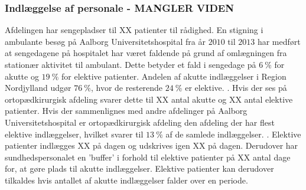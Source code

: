 \subsubsection{Indlæggelse af personale - MANGLER VIDEN}
Afdelingen har sengepladser til XX patienter til rådighed. En stigning i ambulante besøg på Aalborg Universitetshospital fra år $2010$ til $2013$ har medført at sengedagene på hospitalet har været faldende på grund af omlægningen fra stationær aktivitet til ambulant. Dette betyder et fald i sengedage på $6~\%$ for akutte og $19~\%$ for elektive patienter. Andelen af akutte indlæggelser i Region Nordjylland udgør $76~\%$, hvor de resterende $24~\%$ er elektive. \cite{RegionNord2016}. Hvis der ses på ortopædkirurgisk afdeling svarer dette til XX antal akutte og XX antal elektive patienter. Hvis der sammenlignes med andre afdelinger på Aalborg Universitetshospital er ortopædkirurgisk afdeling den afdeling der har flest elektive indlæggelser, hvilket svarer til $13~\%$ af de samlede indlæggelser. \cite{RegionNord2016}. Elektive patienter indlægges XX på dagen og udskrives igen XX på dagen. Derudover har sundhedspersonalet en 'buffer' i forhold til elektive patienter på XX antal dage for, at gøre plads til akutte indlæggelser. Elektive patienter kan derudover tilkaldes hvis antallet af akutte indlæggelser falder over en periode. 
